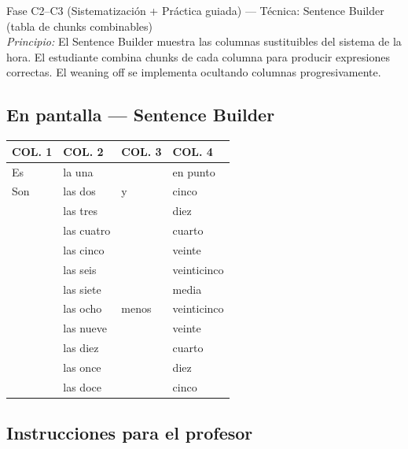 \documentclass[a4paper,11pt]{article}
\begin{document}
{\small Fase C2--C3 (Sistematización + Práctica guiada) — Técnica: Sentence Builder (tabla de chunks combinables)}\\
{\small\textit{Principio:} El Sentence Builder muestra las columnas sustituibles del sistema de la hora. El estudiante combina chunks de cada columna para producir expresiones correctas. El weaning off se implementa ocultando columnas progresivamente.}

\vspace{0.5cm}

\subsection*{En pantalla — Sentence Builder}

\begin{center}
\renewcommand{\arraystretch}{1.3}
\begin{tabular}{|>{\centering\arraybackslash}p{2cm}|>{\centering\arraybackslash}p{3cm}|>{\centering\arraybackslash}p{2.5cm}|>{\centering\arraybackslash}p{3cm}|}
\hline
\rowcolor{violeta!15}
\textbf{COL. 1} & \textbf{COL. 2} & \textbf{COL. 3} & \textbf{COL. 4} \\
\hline
Es & la una & & en punto \\
\hline
Son & las dos & \cellcolor{verde!10} y & cinco \\
\cline{4-4}
 & las tres & & diez \\
\cline{4-4}
 & las cuatro & & cuarto \\
\cline{4-4}
 & las cinco & & veinte \\
\cline{4-4}
 & las seis & & veinticinco \\
\cline{4-4}
 & las siete & & media \\
\cline{3-4}
 & las ocho & \cellcolor{rojog!10} menos & veinticinco \\
\cline{4-4}
 & las nueve & & veinte \\
\cline{4-4}
 & las diez & & cuarto \\
\cline{4-4}
 & las once & & diez \\
\cline{4-4}
 & las doce & & cinco \\
\hline
\end{tabular}
\end{center}

\vspace{0.5cm}

\subsection*{Instrucciones para el profesor}
\end{document}
